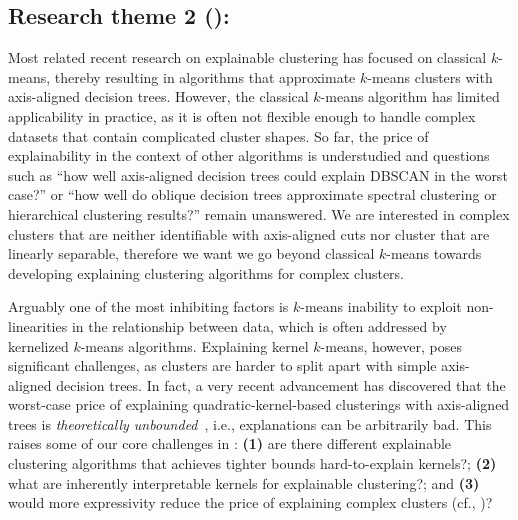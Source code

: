 \documentclass[a4paper,11pt]{article}
\begin{document}

\subsection*{Research theme 2 (\rtw): \clusterings}

Most related recent research on explainable clustering has focused on classical $k$-means,
thereby resulting in algorithms that approximate $k$-means clusters with axis-aligned decision trees.
However, the classical $k$-means algorithm has limited applicability in practice, as it is often not flexible enough to handle complex datasets that contain complicated cluster shapes.
So far, the price of explainability in the context of other algorithms is understudied and questions such as ``how well axis-aligned decision trees could explain DBSCAN in the worst case?'' or ``how well do oblique decision trees approximate spectral clustering or hierarchical clustering results?'' remain unanswered.
We are interested in complex clusters that are neither identifiable with axis-aligned cuts nor cluster that are linearly separable,
therefore we want we go beyond classical $k$-means towards developing explaining clustering algorithms for complex clusters.

Arguably one of the most inhibiting factors is $k$-means inability to exploit non-linearities in the relationship between data, which is often addressed by kernelized $k$-means algorithms.
Explaining kernel $k$-means, however, poses significant challenges, as clusters are harder to split apart 
with simple axis-aligned decision trees. 
In fact, a very recent advancement has discovered that the worst-case price of explaining quadratic-kernel-based clusterings with axis-aligned trees is \emph{theoretically unbounded}~\cite{fleissner2024explaining}, 
i.e., explanations can be arbitrarily bad. 
This raises some of our core challenges in \rtw:
\textbf{(1)} are there different explainable clustering algorithms that achieves tighter bounds hard-to-explain kernels?;
\textbf{(2)} what are inherently interpretable kernels for explainable clustering?; and
\textbf{(3)} would more expressivity reduce the price of explaining complex clusters (cf., \rto)?
\end{document}
